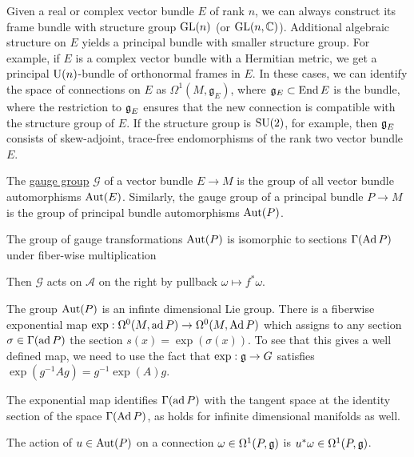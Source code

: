 Given a real or complex vector bundle $E$ of rank $n$, we can always construct 
its frame bundle with structure group $\operatorname{GL}(n)$ (or $\operatorname{GL}(n,\mathbb{C})$).
Additional algebraic structure on $E$ yields a principal bundle with smaller
structure group. For example,
if $E$ is a complex vector bundle with a Hermitian metric, we get a principal
$\operatorname{U}(n)$-bundle of orthonormal frames in  $E$. In these cases, we can identify
the space of connections on $E$ as $\Omega^1(M,\mathfrak{g}_E)$, where
$\mathfrak{g}_E \subset \operatorname{End} E$ is the bundle, 
where the restriction to $\operatorname{\mathfrak{g}}_E$ ensures that the new connection is
compatible with the structure group of  $E$.
If the structure group is $\operatorname{SU}(2)$, for example, then
$\operatorname{\mathfrak{g}}_E$ consists of skew-adjoint, trace-free endomorphisms of the rank two vector
bundle $E$. 

\begin{defn}
	The \underline{gauge group} $\mathcal{G}$ of a vector bundle $E\to M$ is the group of all
	vector bundle automorphisms $\operatorname{Aut}(E)$. Similarly, the gauge group of a
	principal bundle $P\to M$ is the group of principal bundle automorphisms
	$\operatorname{Aut}(P)$.
\end{defn}

\begin{prop} %
	The group of gauge transformations $\operatorname{Aut}(P)$ is isomorphic to 
	sections $\Gamma(\operatorname{Ad} P)$ under fiber-wise multiplication 
\end{prop}

Then $\mathcal{G}$ acts on $\mathcal{A}$ on the right by pullback 
$\omega\mapsto f^*\omega$.

The group $\operatorname{Aut}(P)$ is an infinte dimensional Lie group. 
There is a fiberwise exponential map $\exp : \Omega^0(M,\operatorname{ad} P) \to
\Omega^0(M,\operatorname{Ad} P)$ which assigns to any section  $\sigma \in \Gamma(\operatorname{ad} P)$ the
section  $s(x)=\exp(\sigma(x))$. To see that this gives a well defined map, we
need to use the fact that  $\exp : \operatorname{\mathfrak{g}} \to G$ satisfies
$\exp(g^{-1}Ag)=g^{-1}\exp(A)g$. 

The exponential map identifies $\Gamma(\operatorname{ad} P)$ with the tangent space at the
identity section of the space  $\Gamma(\operatorname{Ad} P)$, as holds for infinite
dimensional manifolds as well. 

The action of $u \in \operatorname{Aut}(P)$ on a connection  $\omega\in \Omega^1(P,\operatorname{\mathfrak{g}})$ is
$u^*\omega \in \Omega^1(P,\operatorname{\mathfrak{g}})$. 

